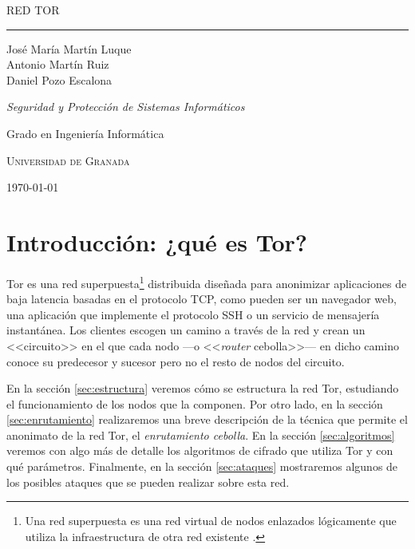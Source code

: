 \documentclass[
  a4paper,
  12pt,
  spanish,
]{scrartcl}
\DeclareRobustCommand{\spacedallcaps}[1]{{\linespread{1.3}\sacshape\MakeTextUppercase{#1}}}%
\newcommand{\horrule}[1]{\rule{\linewidth}{#1}}
\begin{document}
\begin{titlepage}
  \vspace*{4cm}

  \begin{flushleft}
    \Huge
    \spacedallcaps{Red Tor}
    \horrule{2pt}
  \end{flushleft}

  \vspace{2em}

  \begin{flushright}
    \large
    José María Martín Luque\\
    Antonio Martín Ruiz\\
    Daniel Pozo Escalona\vspace{1em}

    \textit{Seguridad y Protección de Sistemas Informáticos}

    Grado en Ingeniería Informática

    \textsc{Universidad de Granada}\vspace{1em}

    \today\vspace{.5em}
  \end{flushright}
\end{titlepage}

\newpage

{\hypersetup{hidelinks}
\tableofcontents
}

\newpage

\section{Introducción: ¿qué es Tor?}

Tor es una red superpuesta\footnote{
  Una red superpuesta es una red virtual de nodos enlazados lógicamente que utiliza la infraestructura de otra red existente \parencite[154]{kurose_computer_2013}.
} distribuida diseñada para anonimizar aplicaciones de baja latencia basadas en el protocolo TCP, como pueden ser un navegador web, una aplicación que implemente el protocolo SSH o un servicio de mensajería instantánea.
Los clientes escogen un camino a través de la red y crean un <<circuito>> en el que cada nodo ---o <<\textit{router} cebolla>>--- en dicho camino conoce su predecesor y sucesor pero no el resto de nodos del circuito.

En la sección \ref{sec:estructura} veremos cómo se estructura la red Tor, estudiando el funcionamiento de los nodos que la componen. 
Por otro lado, en la sección \ref{sec:enrutamiento} realizaremos una breve descripción de la técnica que permite el anonimato de la red Tor, el \textit{enrutamiento cebolla}. 
En la sección \ref{sec:algoritmos} veremos con algo más de detalle los algoritmos de cifrado que utiliza Tor y con qué parámetros. 
Finalmente, en la sección \ref{sec:ataques} mostraremos algunos de los posibles ataques que se pueden realizar sobre esta red.  
\end{document}
